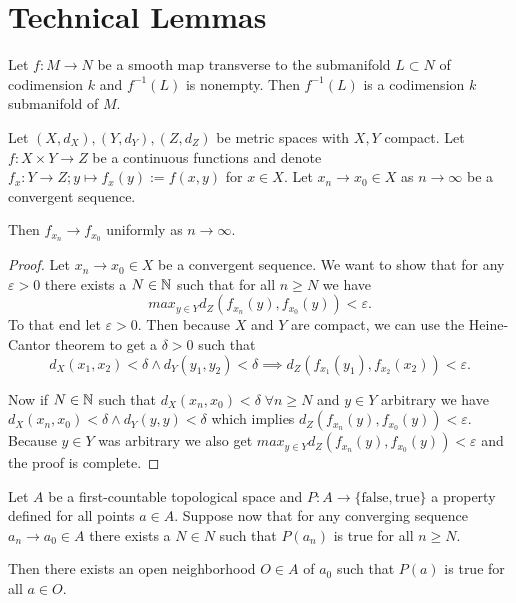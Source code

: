 \chapter{Technical Lemmas}

\begin{lemma}\label{lem:transmap}
    Let $f:M\to N$ be a smooth map transverse to the submanifold $L\subset N$ of codimension $k$ and $f^{-1}(L)$ is nonempty.
    Then $f^{-1}(L)$ is a codimension $k$ submanifold of $M$.
\end{lemma}


\begin{lemma}\label{lem:unifconvoncompact}
    Let $(X,d_X),(Y,d_Y),(Z,d_Z)$ be metric spaces with $X,Y$ compact. Let $f:X\times Y\to Z$ be a continuous functions and denote $f_x:Y\to Z;y\mapsto f_x(y):=f(x,y)$ for $x\in X$. Let $x_n\to x_0 \in X$ as $n\to\infty$ be a convergent sequence.

    Then $f_{x_n}\to f_{x_0}$ uniformly as $n\to \infty$.
\end{lemma}
\begin{proof}
    Let $x_n\to x_0\in X$ be a convergent sequence. We want to show that for any $\varepsilon > 0$ there exists a $N\in \mathbb{N}$ such that for all $n \ge N$ we have 
    \[
        max_{y\in Y} d_Z(f_{x_n}(y),f_{x_0}(y))<\varepsilon.
    \]
    To that end let $\varepsilon>0$. Then because $X$ and $Y$ are compact, we can use the Heine-Cantor theorem to get a $\delta>0$ such that 
    \[
        d_X(x_1,x_2)<\delta \wedge d_Y(y_1,y_2)<\delta \implies d_Z(f_{x_1}(y_1),f_{x_2}(x_2))<\varepsilon.
    \]

    Now if $N\in \mathbb{N}$ such that $d_X(x_n,x_0)<\delta \; \forall n\ge N$ and $y\in Y$ arbitrary we have 
    $d_X(x_n,x_0)<\delta \wedge d_Y(y,y)<\delta$ which implies $d_Z(f_{x_n}(y),f_{x_0}(y))<\varepsilon$. Because $y\in Y$ was arbitrary we also get $max_{y\in Y} d_Z(f_{x_n}(y),f_{x_0}(y))<\varepsilon$ and the proof is complete.
\end{proof}


\begin{lemma}\label{lem:firstcount}
    Let $A$ be a first-countable topological space and $P:A\to \{\text{false},\text{true}\}$ a property defined for all points $a\in A$. Suppose now that for any converging sequence $a_n\to a_0\in A$ there exists a $N\in N$ such that $P(a_n)$ is true for all $n\ge N$.
    
    Then there exists an open neighborhood $O\in A$ of $a_0$ such that $P(a)$ is true for all $a\in O$.
\end{lemma}


